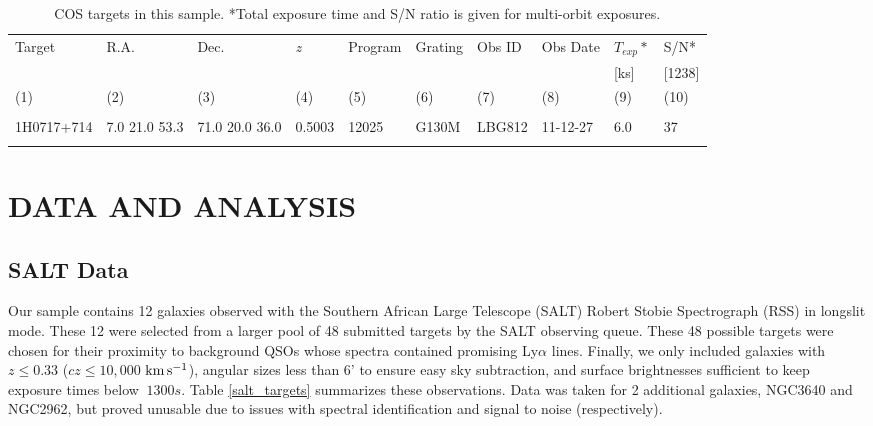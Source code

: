 \documentclass[iop]{emulateapj-rtx4}
\newcommand{\kms}{$\rm km\, s^{-1}$}
\begin{document}
\begin{table}[ht]\footnotesize
\begin{center}
\begin{tabular}{l l l l l l l l l l}
 \hline \hline
  Target 		& R.A. 		& Dec. 		& \textit{z}		 & Program 	  & Grating 	  & Obs ID 	    & Obs Date 	    & $T_{exp}*$     & S/N*  \\ 
  	    		& 	       		&	  		& 		  	 & 		    	  & 		  	  & 		  	   & 		     	    & 	        [ks]        & [1238] \\ 
 \scriptsize (1)  & \scriptsize (2) & \scriptsize (3) & \scriptsize (4) & \scriptsize (5) & \scriptsize (6) & \scriptsize  (7) & \scriptsize (8) & \scriptsize (9) & \scriptsize (10)  \\ \hline \hline
\\
    
1H0717+714		  &  7.0  21.0   53.3  &     71.0  20.0  36.0  &    0.5003  & 12025  	    &   G130M  &   LBG812  		 & 11-12-27      	 	  &  6.0    &      37         \\



 \\
\hline

\end{tabular}
\end{center}
  \caption{\small{COS targets in this sample. *Total exposure time and S/N ratio is given for multi-orbit exposures.}}
  \label{target_table}
\end{table}


\section{DATA AND ANALYSIS}

\subsection{SALT Data}
Our sample contains 12 galaxies observed with the Southern African Large Telescope (SALT) Robert Stobie Spectrograph (RSS) in longslit mode. These 12 were selected from a larger pool of 48 submitted targets by the SALT observing queue. These 48 possible targets were chosen for their proximity to background QSOs whose spectra contained promising Ly$\alpha$ lines. Finally, we only included galaxies with $z \leq 0.33$ ($cz \leq 10,000$ \kms), angular sizes less than 6' to ensure easy sky subtraction, and surface brightnesses sufficient to keep exposure times below $~1300 s$. Table \ref{salt_targets} summarizes these observations. Data was taken for 2 additional galaxies, NGC3640 and NGC2962, but proved unusable due to issues with spectral identification and signal to noise (respectively).
\end{document}
